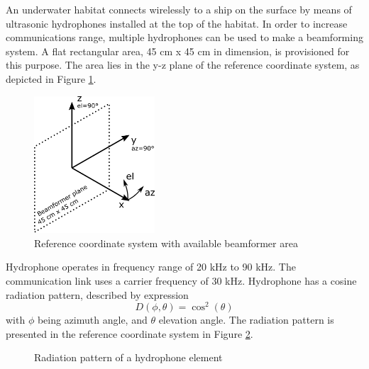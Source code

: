 \documentclass{article}
\begin{document}
An underwater habitat connects wirelessly to a ship on the surface by means of 
ultrasonic hydrophones installed at the top of the habitat. In order to 
increase communications range, multiple hydrophones can be used to make a 
beamforming system. A flat rectangular area, 45 cm x 45 cm in dimension, is 
provisioned for this purpose. The area lies in the y-z plane of the reference 
coordinate system, as depicted in Figure \ref{fig:coord}.
\begin{figure}[h!]
	\centering
	\includegraphics[width=0.4\textwidth]{coord.png}
	\caption{Reference coordinate system with available beamformer area}
	\label{fig:coord}
\end{figure}

Hydrophone operates in frequency range of 20 kHz to 90 kHz. The communication 
link uses a carrier frequency of 30 kHz. Hydrophone has a cosine radiation 
pattern, described by expression
\[ D(\phi,\theta) = \cos^2(\theta) \]
with $\phi$ being azimuth angle, and $\theta$ elevation angle. The radiation 
pattern is presented in the reference coordinate system in Figure 
\ref{fig:hydrophone}.
\begin{figure}[h!]
	\centering
	\hfill
	\caption{Radiation pattern of a hydrophone element}
	\label{fig:hydrophone}
\end{figure}
\end{document}
